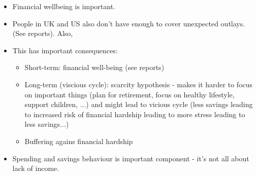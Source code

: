 \begin{itemize}
    \item Financial wellbeing is important.

    \item People in UK and US also don't have enough to cover unexpected
        outlays. (See reports). Also, \citet{sabat2019rules}

    \item This has important consequences:

        \begin{itemize}

            \item Short-term: financial well-being (see reports)

            \item Long-term (viscious cycle): scarcity hypothesis - makes it
                harder to focus on important things (plan for retirement, focus
                on healthy lifestyle, support children, ...) and might lead to
                vicious cycle (less savings leading to increased risk of
                financial hardship leading to more stress leading to less
                savings...)

            \item Buffering agains financial hardship \citep{roll2020income}
        \end{itemize}

    \item Spending and savings behaviour is important component - it's not all
        about lack of income.

\end{itemize}


